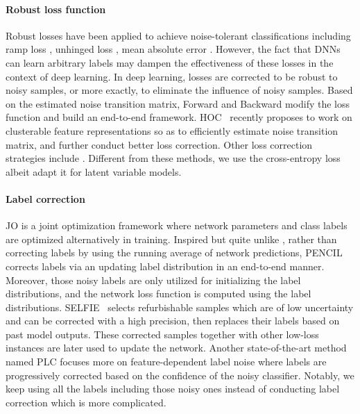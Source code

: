 \documentclass[journal]{IEEEtran}
\begin{document}
\paragraph{Robust loss function}
Robust losses have been applied to achieve noise-tolerant classifications including ramp loss \cite{brooks2011support}, unhinged loss \cite{van2015learning}, mean absolute error \cite{suykens2002least, ghosh2017robust, suykens1999least}. 
However, the fact that DNNs can learn arbitrary labels may dampen the effectiveness of these losses in the context of deep learning.
In deep learning, losses are corrected to be robust to noisy samples, or more exactly, to eliminate the influence of noisy samples.
Based on the estimated noise transition matrix, Forward and Backward \cite{patrini2017making} modify the loss function and build an end-to-end framework.
HOC~\cite{zhu2021clusterability} recently proposes to work on clusterable feature representations so as to efficiently estimate noise transition matrix, and further conduct better loss correction.
Other loss correction strategies include \cite{reed2014training,goldberger2017training}.
Different from these methods, we use the cross-entropy loss albeit adapt it for latent variable models.

\paragraph{Label correction}
JO \cite{tanaka2018joint} is a joint optimization framework where network parameters and class labels are optimized alternatively in training.
Inspired but quite unlike \cite{tanaka2018joint}, rather than correcting labels by using the running average of network predictions, PENCIL \cite{yi2019probabilistic} corrects labels via an updating label distribution in an end-to-end manner. 
Moreover, those noisy labels are only utilized for initializing the label distributions, and 
the network loss function is computed using the label distributions.
SELFIE~\cite{song2019selfie} selects refurbishable samples which are of low uncertainty and can be corrected with a high precision, then replaces their labels based on past model outputs. These corrected samples together with other low-loss instances are later used to update the network.
Another state-of-the-art method named PLC \cite{zhang2021learning} focuses more on feature-dependent label noise where labels are progressively corrected based on the confidence of the noisy classifier.
Notably, we keep using all the labels including those noisy ones instead of conducting label correction which is more complicated.
\end{document}
